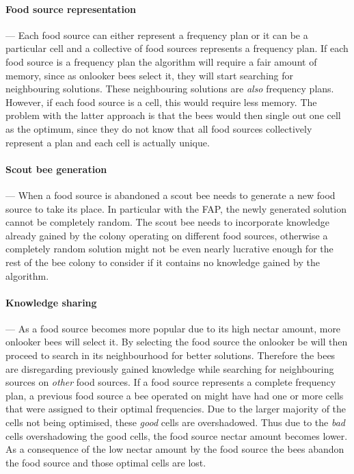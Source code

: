 \paragraph{Food source representation}
--- Each food source can either represent a frequency plan or it can be a particular cell and a collective of food sources represents a frequency plan. If each food source is a frequency plan the algorithm will require a fair amount of memory, since as onlooker bees select it, they will start searching for neighbouring solutions. These neighbouring solutions are \emph{also} frequency plans. However, if each food source is a cell, this would require less memory. The problem with the latter approach is that the bees would then single out one cell as the optimum, since they do not know that all food sources collectively represent a plan and each cell is actually unique.
\paragraph{Scout bee generation}
--- When a food source is abandoned a scout bee needs to generate a new food source to take its place. In particular with the FAP, the newly generated solution cannot be completely random. The scout bee needs to incorporate knowledge already gained by the colony operating on different food sources, otherwise a completely random solution might not be even nearly lucrative enough for the rest of the bee colony to consider if it contains no knowledge gained by the algorithm.
\paragraph{Knowledge sharing}
--- As a food source becomes more popular due to its high nectar amount, more onlooker bees will select it. By selecting the food source the onlooker be will then proceed to search in its neighbourhood for better solutions. Therefore the bees are disregarding previously gained knowledge while searching for neighbouring sources on \emph{other} food sources. If a food source represents a complete frequency plan, a previous food source a bee operated on might have had one or more cells that were assigned to their optimal frequencies. Due to the larger majority of the cells not being optimised, these \emph{good} cells are overshadowed. Thus due to the \emph{bad} cells overshadowing the good cells, the food source nectar amount becomes lower. As a consequence of the low nectar amount by the food source the bees abandon the food source and those optimal cells are lost.

